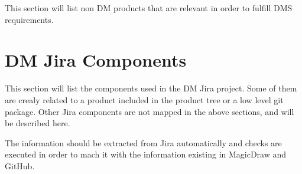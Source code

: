 This section will list non DM products that are relevant in order to fulfill DMS requirements.


\newpage
\section{DM Jira Components}\label{sec:jiracomponents}

This section will list the components used in the DM Jira project.
Some of them are crealy related to a product included in the product tree or a low level git package.
Other Jira components are not mapped in the above sections, and will be described here.

The information should be extracted from Jira automatically and checks are executed in order to mach it with the information existing in MagicDraw and GitHub.
